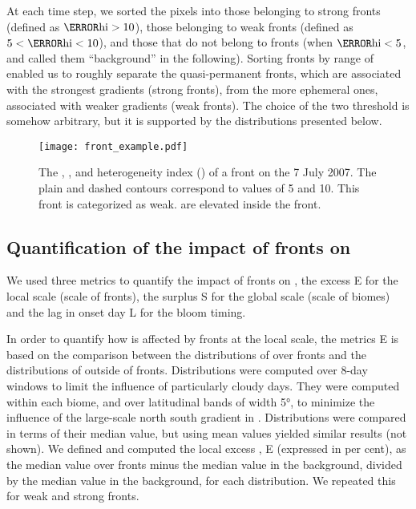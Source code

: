 At each time step, we sorted the pixels into those belonging to strong fronts (defined as \(\mathrm{\as{hi}} > 10\)), those belonging to weak fronts (defined as \(5 < \mathrm{\as{hi}} < 10\)), and those that do not belong to fronts (when \(\mathrm{\as{hi}} < 5\), and called them ``background'' in the following).
Sorting fronts by range of  enabled us to roughly separate the quasi-permanent fronts, which are associated with the strongest  gradients (strong fronts), from the more ephemeral ones, associated with weaker gradients (weak fronts).
The choice of the two  threshold is somehow arbitrary, but it is supported by the  distributions presented below.


\begin{figure*}
  \texttt{[image: front\_example.pdf]}
  \caption{
    The , , and heterogeneity index () of a front on the 7 July 2007.
    The plain and dashed contours correspond to  values of 5 and 10.
    This front is categorized as weak.
     are elevated inside the front.
  }%
  \label{fig:zoom}
\end{figure*}

\subsection{Quantification of the impact of fronts on }

We used three metrics to quantify the impact of fronts on , the excess   E for the local scale (scale of fronts), the surplus   S for the global scale (scale of biomes) and the lag in onset day L for the bloom timing.

In order to quantify how  is affected by fronts at the local scale, the metrics E is based on the comparison between the distributions of  over fronts and the distributions of  outside of fronts.
Distributions were computed over 8-day windows to limit the influence of particularly cloudy days.
They were computed within each biome, and over latitudinal bands of width 5°, to minimize the influence of the large-scale north south gradient in .
Distributions were compared in terms of their median value, but using mean values yielded similar results (not shown).
We defined and computed the local excess , E (expressed in per cent), as the median value over fronts minus the median value in the background, divided by the median value in the background, for each distribution.
We repeated this for weak and strong fronts.

